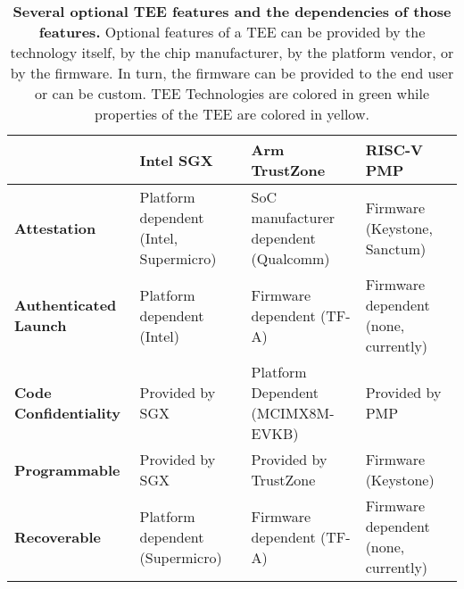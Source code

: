 \begin{table*}[p]
\begin{tabular}{|L{3cm}|L{3.25cm}|L{3.25cm}|L{3.25cm}|}
\hline
\textbf{}                                  & \textbf{Intel SGX} & \textbf{Arm TrustZone} & \textbf{RISC-V PMP}   \\ \hline
{}\textbf{Attestation}          & Platform dependent (Intel, Supermicro)                        & SoC manufacturer dependent (Qualcomm)                   & Firmware (Keystone, Sanctum)             \\ \hline
{}\textbf{Authenticated Launch} & Platform dependent (Intel)                        & Firmware dependent (TF-A)                            & Firmware dependent (none, currently)          \\ \hline
{}\textbf{Code Confidentiality} & Provided by SGX                            & Platform Dependent  (MCIMX8M-EVKB)                           & Provided by PMP                               \\ \hline
{}\textbf{Programmable}         & Provided by SGX                            & Provided by TrustZone                          & Firmware (Keystone)                      \\ \hline
{}\textbf{Recoverable}          & Platform dependent (Supermicro)                      & Firmware dependent  (TF-A)                          & Firmware dependent (none, currently) \\ \hline
\end{tabular}
\caption[TEE Features and their dependencies]{\textbf{Several optional TEE features and the dependencies of those features.} Optional features of a TEE can be provided by the technology itself, by the chip manufacturer, by the platform vendor, or by the firmware. In turn, the firmware can be provided to the end user or can be custom. TEE Technologies are colored in \colorbox{tbl-gre}{green} while properties of the TEE are colored in \colorbox{tbl-yel}{yellow}.}
\label{tab:tee-compare}
\end{table*}

